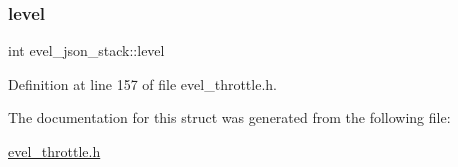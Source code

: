 \subsubsection{\texorpdfstring{level}{level}}
{\footnotesize\ttfamily int evel\+\_\+json\+\_\+stack\+::level}



Definition at line 157 of file evel\+\_\+throttle.\+h.



The documentation for this struct was generated from the following file\+:\begin{DoxyCompactItemize}
\item 
\hyperlink{evel__throttle_8h}{evel\+\_\+throttle.\+h}\end{DoxyCompactItemize}
